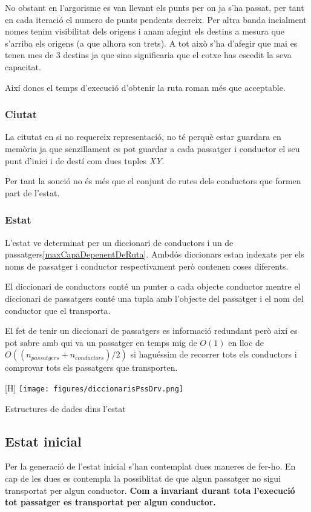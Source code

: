 No obstant en l'argorisme es van llevant els punts per on ja s'ha passat, per tant
en cada iteració el numero de punts pendents decreix. Per altra banda incialment nomes tenim
visibilitat dels origens i anam afegint els destins a mesura que s'arriba els origens (a que alhora son trets).
A tot això s'ha d'afegir que mai es tenen mes de 3 destins ja que sino significaria
que el cotxe has escedit la seva capacitat.

Així doncs el temps d'execució d'obtenir la ruta roman més que acceptable.

\subsubsection{Ciutat}
La citutat en si no requereix representació, no té perquè estar guardara en memòria ja que senzillament
es pot guardar a cada passatger i conductor el seu punt d'inici i de destí com dues tuples \emph{XY}.

Per tant la so\lgem ució no és més que el conjunt de rutes dels conductors que formen part de l'estat.

\subsubsection{Estat}
L'estat ve determinat per un diccionari de conductors i un de passatgers\ref{maxCapaDepenentDeRuta}.
Ambdós diccionars estan indexats per els noms de passatger i conductor respectivament però contenen coses diferents.

El diccionari de conductors conté un punter a cada objecte conductor mentre el diccionari
de passatgers conté una tupla amb l'objecte del passatger i el nom del conductor que el transporta.

El fet de tenir un diccionari de passatgers es informació redundant però així es pot sabre
amb qui va un passatger en temps mig de $O(1)$ en lloc de $O((n_{passatgers} + n_{conductors})/2)$ 
si haguéssim de recorrer tots els conductors i comprovar tots els passatgers que transporten.

\begin{center}[H]\label{maxCapaDepenentDeRuta}
 \texttt{[image: figures/diccionarisPssDrv.png]}
 \caption{Estructures de dades dins l'estat}
\end{center}


\subsection{Estat inicial}
Per la generació de l'estat inicial s'han contemplat dues maneres de fer-ho. En cap de les dues es contempla
la possiblitat de que algun passatger no sigui transportat per algun conductor. \textbf{Com a invariant durant
tota l'execució tot passatger es transportat per algun conductor.}

